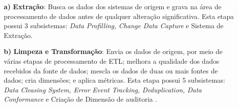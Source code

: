 \begin{itemize}
	\item[\textbf{a)}] \textbf{Extração}: Busca os dados dos sistemas de origem e grava na área de processamento de dados antes de qualquer alteração significativa. Esta etapa possui 3 subsistemas: \textit{Data Profilling, Change Data Capture} e Sistema de Extração.
	
	\item[\textbf{b)}] \textbf{Limpeza e Transformação}: Envia os dados de origem, por meio de várias etapas de processamento de ETL; melhora a qualidade dos dados recebidos da fonte de dados; mescla os dados de duas ou mais fontes de dados; cria dimensões; e aplica métricas. Esta etapa possui 5 subsistemas: \textit{Data Cleasing System, Error Event Tracking, Deduplication, Data Conformance} e Criação de Dimensão de auditoria .
	

\end{itemize}
